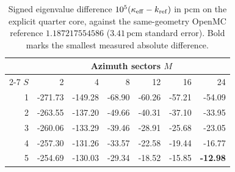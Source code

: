 \begin{table}[htbp]
\centering
\caption{Signed eigenvalue difference $10^{5}(\kappa_{\mathrm{eff}}-k_\mathrm{ref})$ in pcm on the explicit quarter core, against the same-geometry OpenMC reference $1.187217554586$ ($3.41\,\mathrm{pcm}$ standard error). Bold marks the smallest measured absolute difference.}
\label{tab:study4-core-pcm}
\begin{tabular}{rrrrrrr}
\hline
 & \multicolumn{6}{c}{Azimuth sectors $M$}\\
\cline{2-7}
$S$ & 2 & 4 & 8 & 12 & 16 & 24\\
\hline
1 & -271.73 & -149.28 & -68.90 & -60.26 & -57.21 & -54.09 \\
2 & -263.55 & -137.20 & -49.66 & -40.31 & -37.10 & -33.95 \\
3 & -260.06 & -133.29 & -39.46 & -28.91 & -25.68 & -23.05 \\
4 & -257.30 & -131.26 & -33.57 & -22.58 & -19.44 & -16.77 \\
5 & -254.69 & -130.03 & -29.34 & -18.52 & -15.85 & \textbf{-12.98} \\
\hline
\end{tabular}
\end{table}

